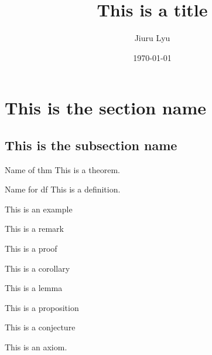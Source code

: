 

\title{\textbf{This is a title}}
\author{Jiuru Lyu}
\date{\today}


\maketitle

\tableofcontents

\section{This is the section name}
\subsection{This is the subsection name}

\begin{thm}{Name of thm}
	This is a theorem. 
\end{thm}

\begin{df}{Name for df}
	This is a definition. 
\end{df}

\begin{eg}
	This is an example
	\begin{sol}
		
	\end{sol}
\end{eg}

\begin{rmk}
	This is a remark
\end{rmk}

\begin{prf}
	This is a proof
\end{prf}

\begin{cor}{}
	This is a corollary
\end{cor}

\begin{lem}{}
	This is a lemma
\end{lem}

\begin{prop}{}
	This is a proposition
\end{prop}

\begin{conj}{}
	This is a conjecture
\end{conj}

\begin{ax}{}
	This is an axiom.
\end{ax}

